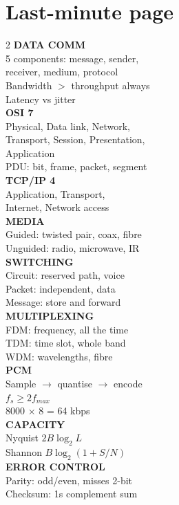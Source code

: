 \documentclass[11pt,a4paper]{article}
\begin{document}
\section{Last-minute page}

\begin{multicols}{2}
\textbf{DATA COMM}\\
5 components: message, sender,\\
receiver, medium, protocol\\[3pt]
Bandwidth $>$ throughput always\\
Latency vs jitter\\[5pt]
\textbf{OSI 7}\\
Physical, Data link, Network,\\
Transport, Session, Presentation,\\
Application\\
PDU: bit, frame, packet, segment\\[5pt]
\textbf{TCP/IP 4}\\
Application, Transport,\\
Internet, Network access\\[5pt]
\textbf{MEDIA}\\
Guided: twisted pair, coax, fibre\\
Unguided: radio, microwave, IR\\[5pt]
\textbf{SWITCHING}\\
Circuit: reserved path, voice\\
Packet: independent, data\\
Message: store and forward\\[5pt]
\textbf{MULTIPLEXING}\\
FDM: frequency, all the time\\
TDM: time slot, whole band\\
WDM: wavelengths, fibre\\[5pt]
\textbf{PCM}\\
Sample $\to$ quantise $\to$ encode\\
$f_s \ge 2f_{max}$\\
8000 $\times$ 8 = 64 kbps\\[5pt]
\textbf{CAPACITY}\\
Nyquist $2B\log_2 L$\\
Shannon $B\log_2(1+S/N)$\\[5pt]
\textbf{ERROR CONTROL}\\
Parity: odd/even, misses 2-bit\\
Checksum: 1s complement sum\\

\end{multicols}
\end{document}
